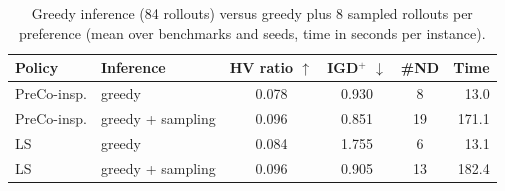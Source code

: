 \begin{table}[htbp]
\centering
\caption{Greedy inference (84 rollouts) versus greedy plus 8 sampled rollouts per preference (mean over benchmarks and seeds, time in seconds per instance).}
\label{tab:sampling}
\footnotesize
\setlength{\tabcolsep}{4pt}
\begin{tabular}{llcccr}
\toprule
Policy & Inference & HV ratio $\uparrow$ & IGD$^+$ $\downarrow$ & \#ND & Time \\
\midrule
PreCo-insp. & greedy & 0.078 & 0.930 & 8 & 13.0 \\
PreCo-insp. & greedy + sampling & 0.096 & 0.851 & 19 & 171.1 \\
LS & greedy & 0.084 & 1.755 & 6 & 13.1 \\
LS & greedy + sampling & 0.096 & 0.905 & 13 & 182.4 \\
\bottomrule
\end{tabular}
\end{table}

